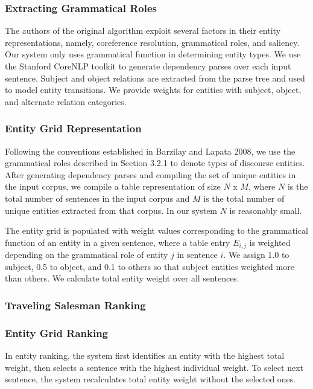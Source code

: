 \documentclass[11pt]{article}
\begin{document}
	\subsubsection{Extracting Grammatical Roles}
	The authors of the original algorithm exploit several factors in their entity representations, namely, coreference resolution, grammatical roles, and saliency. Our system only uses grammatical function in determining entity types. We use the Stanford CoreNLP toolkit to generate dependency parses over each input sentence. Subject and object relations are extracted from the parse tree and used to model entity transitions. We provide weights for entities with subject, object, and alternate relation categories.
	
	\subsubsection{Entity Grid Representation}
	Following the conventions established in Barzilay and Lapata 2008, we use the grammatical roles described in Section 3.2.1 to denote types of discourse entities. After generating dependency parses and compiling the set of unique entities in the input corpus, we compile a table representation of size $N$ x $M$, where $N$ is the total number of sentences in the input corpus and $M$ is the total number of unique entities extracted from that corpus. In our system $N$ is reasonably small.
	
	The entity grid is populated with weight values corresponding to the grammatical function of an entity in a given sentence, where a table entry $E_{i,j}$ is weighted depending on the grammatical role of entity $j$ in sentence $i$. We assign 1.0 to subject, 0.5 to object, and 0.1 to others so that subject entities weighted more than others. We calculate total entity weight over all sentences.
	
	\subsubsection{Traveling Salesman Ranking}
	
	\subsubsection{Entity Grid Ranking}
	In entity ranking, the system first identifies an entity with the highest total weight, then selects a sentence with the highest individual weight. To select next sentence, the system recalculates total entity weight without the selected ones. 
	
\end{document}
